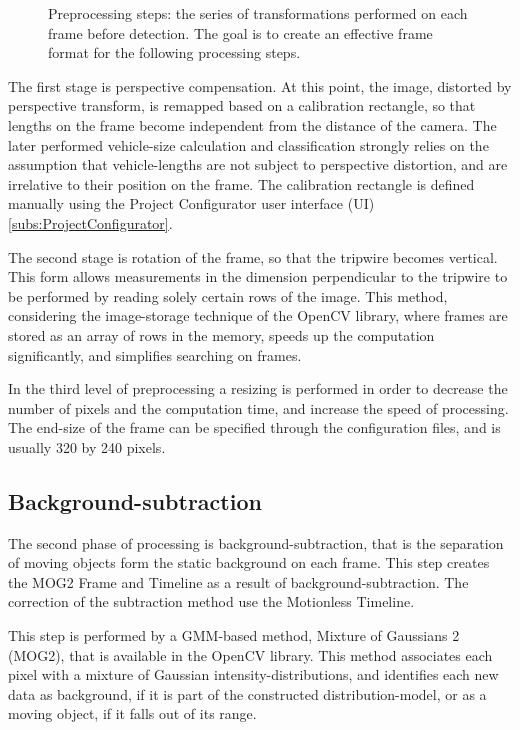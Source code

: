 \begin{figure}[!h]
	\centering
	\scalebox{0.5}{}
	\caption{Preprocessing steps: the series of transformations performed on each frame before detection. The goal is to create an effective frame format for the following processing steps.\label{fig:transforms}}
\end{figure}

The first stage is perspective compensation.
At this point, the image, distorted by perspective transform, is remapped based on a calibration rectangle, so that lengths on the frame become independent from the distance of the camera.
The later performed vehicle-size calculation and classification strongly relies on the assumption that vehicle-lengths are not subject to perspective distortion, and are irrelative to their position on the frame.
The calibration rectangle is defined manually using the Project Configurator user interface (UI)\ref{subs:ProjectConfigurator}.

The second stage is rotation of the frame, so that the tripwire becomes vertical.
This form allows measurements in the dimension perpendicular to the tripwire to be performed by reading solely certain rows of the image.
This method, considering the image-storage technique of the OpenCV library, where frames are stored as an array of rows in the memory, speeds up the computation significantly, and simplifies searching on frames.

In the third level of preprocessing a resizing is performed in order to decrease the number of pixels and the computation time, and increase the speed of processing.
The end-size of the frame can be specified through the configuration files, and is usually 320 by 240 pixels.
\subsection{Background-subtraction}
The second phase of processing is background-subtraction, that is the separation of moving objects form the static background on each frame.
This step creates the MOG2 Frame and Timeline as a result of background-subtraction.
The correction of the subtraction method use the Motionless Timeline.

This step is performed by a GMM-based method, Mixture of Gaussians 2 (MOG2), that is available in the OpenCV library.
This method associates each pixel with a mixture of Gaussian intensity-distributions, and identifies each new data as background, if it is part of the constructed distribution-model, or as a moving object, if it falls out of its range.

